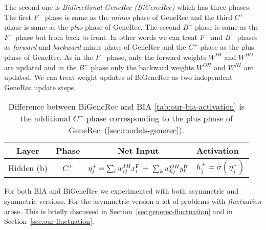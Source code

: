 The second one is \emph{Bidirectional GeneRec (BiGeneRec)} which has three phases. The first $F^{-}$ phase is same as the \emph{minus} phase of GeneRec and the third $C^{+}$ phase is same as the \emph{plus} phase of GeneRec. The second $B^{-}$ phase is same as the $F^{-}$ phase but from back to front. In other words we can treat $F^{-}$ and $B^{-}$ phases as \emph{forward} and \emph{backward} minus phase of GeneRec and the $C^{+}$ phase as the plus phase of GeneRec. As in the $F^{-}$ phase, only the forward weights $W^{IH}$ and $W^{HO}$ are updated and in the $B^{-}$ phase only the backward weights $W^{OH}$ and $W^{HI}$ are updated. We can treat weight updates of BiGeneRec as two independent GeneRec update steps. 

\begin{table}[H] 
  \centering
  \begin{tabular}{|cccl|}
    \hline
    Layer & Phase & Net Input & Activation\\
    \hline
    Hidden (h)   &  $C^{+}$  & $\eta^{+}_j = \sum_{i}w_{ij}^{IH}x^{\rm F}_i$ + $\sum_k w_{kj}^{OH}y^{\rm B}_k$ & $h^{+}_{j} = \sigma(\eta^{+}_j)$ \\
    \hline
  \end{tabular}
  \caption{Difference between BiGeneRec and BIA \ref{tab:our-bia-activation} is the additional $C^{+}$ phase corresponding to the plus phase of GeneRec~(\ref{sec:models-generec}).} 
  \label{tab:our-bigenerec-activation}
\end{table} 

For both BIA and BiGeneRec we experimented with both asymmetric and symmetric versions. For the asymmetric version a lot of problems with \emph{fluctuation} arose. This is briefly discussed in Section~\ref{sec:generec-fluctuation} and in Section~\ref{sec:our-fluctuation}.  

